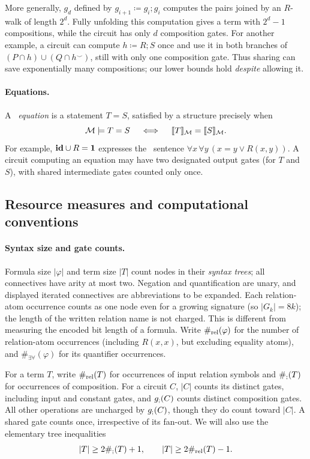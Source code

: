 More generally, $g_d$ defined by
$g_{i+1}\coloneqq g_i;g_i$ computes the pairs joined by an $R$-walk of length
$2^d$. Fully unfolding this computation gives a term with $2^d-1$
compositions, while the circuit has only $d$ composition gates.
For another example, a circuit can compute $h\coloneqq R;S$ once and use it
in both branches of $(P\cap h)\cup(Q\cap h^\smile)$, still with only
one composition gate. Thus sharing can save exponentially many
compositions; our lower bounds hold \emph{despite} allowing it.

\paragraph{Equations.}
A \emph{\CoR\ equation} is a statement $T=S$, satisfied by a
structure precisely when
\[
 \mathcal M\models T=S
  \quad\iff\quad
 \llbracket T\rrbracket_{\mathcal M}=\llbracket S\rrbracket_{\mathcal M}.
\]
For example, $\mathbf{id}\cup R=\mathbf{1}$ expresses the \FOtwo\ sentence
$\forall x\,\forall y\,(x=y\lor R(x,y))$. A circuit computing an
equation may have two designated output gates (for $T$ and $S$),
with shared intermediate gates counted only once.

\subsection{Resource measures and computational conventions}\label{sec:prelim-resources}
\paragraph{Syntax size and gate counts.}
Formula size $|\varphi|$ and term size $|T|$ count nodes in their
\emph{syntax trees}; all connectives have arity at most two. Negation
and quantification are unary, and displayed iterated connectives are
abbreviations to be expanded. Each relation-atom occurrence counts as
one node even for a growing signature (so $|G_k|=8k$); the length of
the written relation name is not charged. This is different from
measuring the encoded bit length of a formula. Write
$\#_{\mathrm{rel}}(\varphi)$ for the number of relation-atom occurrences
(including $R(x,x)$, but excluding equality atoms), and
$\#_{\exists\forall}(\varphi)$ for its quantifier occurrences.

For a term $T$, write $\#_{\mathrm{rel}}(T)$ for occurrences of input relation
symbols and $\#_{;}(T)$ for occurrences of composition. For a circuit
$C$, $|C|$ counts its distinct gates, including input and constant
gates, and $g_{;}(C)$ counts distinct composition gates. All other
operations are uncharged by $g_{;}(C)$, though they do count toward
$|C|$. A shared gate counts once, irrespective of its fan-out. We will
also use the elementary tree inequalities
\[
 |T|\ge2\#_{;}(T)+1,
 \qquad |T|\ge2\#_{\mathrm{rel}}(T)-1.
\]

